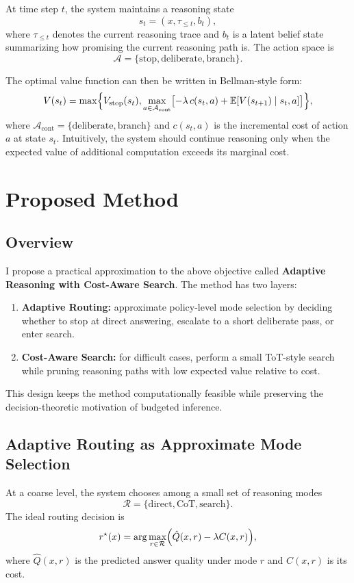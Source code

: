 \documentclass[10pt]{article}
\begin{document}
At time step $t$, the system maintains a reasoning state
\[
s_t=(x,\tau_{\le t},b_t),
\]
where $\tau_{\le t}$ denotes the current reasoning trace and $b_t$ is a latent belief state summarizing how promising the current reasoning path is. The action space is
\[
\mathcal{A}=\{\text{stop},\text{deliberate},\text{branch}\}.
\]

The optimal value function can then be written in Bellman-style form:
\[
V(s_t)=
\max\Bigl\{
V_{\mathrm{stop}}(s_t),
\max_{a\in\mathcal{A}_{\mathrm{cont}}}
\bigl[
-\lambda\,c(s_t,a)+\mathbb{E}[V(s_{t+1})\mid s_t,a]
\bigr]
\Bigr\},
\]
where $\mathcal{A}_{\mathrm{cont}}=\{\text{deliberate},\text{branch}\}$ and $c(s_t,a)$ is the incremental cost of action $a$ at state $s_t$. Intuitively, the system should continue reasoning only when the expected value of additional computation exceeds its marginal cost.

\section{Proposed Method}
\subsection{Overview}
I propose a practical approximation to the above objective called \textbf{Adaptive Reasoning with Cost-Aware Search}. The method has two layers:
\begin{enumerate}[leftmargin=1.3em,itemsep=0.12em]
    \item \textbf{Adaptive Routing:} approximate policy-level mode selection by deciding whether to stop at direct answering, escalate to a short deliberate pass, or enter search.
    \item \textbf{Cost-Aware Search:} for difficult cases, perform a small ToT-style search while pruning reasoning paths with low expected value relative to cost.
\end{enumerate}

This design keeps the method computationally feasible while preserving the decision-theoretic motivation of budgeted inference.

\subsection{Adaptive Routing as Approximate Mode Selection}
At a coarse level, the system chooses among a small set of reasoning modes
\[
\mathcal{R}=\{\text{direct},\text{CoT},\text{search}\}.
\]
The ideal routing decision is
\[
r^\star(x)=
\arg\max_{r\in\mathcal{R}}
\Bigl(
\hat Q(x,r)-\lambda C(x,r)
\Bigr),
\]
where $\hat Q(x,r)$ is the predicted answer quality under mode $r$ and $C(x,r)$ is its cost.
\end{document}
